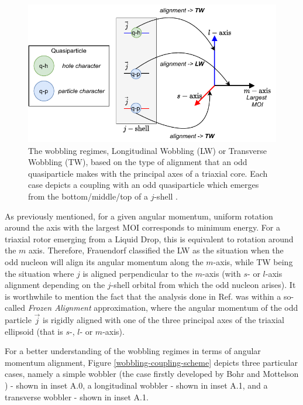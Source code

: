 \documentclass[11pt]{article}
\begin{document}
\begin{figure}
    \centering
    \includegraphics[scale=0.9]{figs/wobbling_Regimes_updated.pdf}
    \caption{The wobbling regimes, Longitudinal Wobbling (LW) or Transverse Wobbling (TW), based on the type of alignment that an odd quasiparticle makes with the principal axes of a triaxial core. Each case depicts a coupling with an odd quasiparticle which emerges from the bottom/middle/top of a $j$-shell \cite{frauendorf2014transverse}.}
    \label{quasiparticle-alignment}
\end{figure}

As previously mentioned, for a given angular momentum, uniform rotation around the axis with the largest MOI corresponds to minimum energy. For a triaxial rotor emerging from a Liquid Drop, this is equivalent to rotation around the $m$ axis. Therefore, Frauendorf \cite{frauendorf2014transverse} classified the LW as the situation when the odd nucleon will align its angular momentum along the $m$-axis, while TW being the situation where $j$ is aligned perpendicular to the $m$-axis (with $s$- or $l$-axis alignment depending on the $j$-shell orbital from which the odd nucleon arises). It is worthwhile to mention the fact that the analysis done in Ref. \cite{frauendorf2014transverse} was within a so-called \emph{Frozen Alignment} approximation, where the angular momentum of the odd particle $\vec{j}$ is rigidly aligned with one of the three principal axes of the triaxial ellipsoid (that is $s$-, $l$- or $m$-axis).

For a better understanding of the wobbling regimes in terms of angular momentum alignment, Figure \ref{wobbling-coupling-scheme} depicts three particular cases, namely a simple wobbler (the case firstly developed by Bohr and Mottelson \cite{bohr1998nuclear}) - shown in inset A.0, a longitudinal wobbler - shown in inset A.1, and a transverse wobbler - shown in inset A.1.
\end{document}
